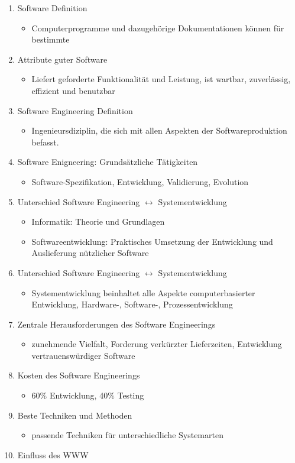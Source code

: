 \begin{enumerate}
    \item Software Definition
    \begin{itemize}
        \item Computerprogramme und dazugehörige Dokumentationen können für bestimmte 
    \end{itemize}
    \item Attribute guter Software 
    \begin{itemize}
        \item Liefert geforderte Funktionalität und Leistung, ist wartbar, zuverlässig, effizient und benutzbar
    \end{itemize}
    \item Software Engineering Definition 
    \begin{itemize}
        \item Ingenieursdiziplin, die sich mit allen Aspekten der Softwareproduktion befasst. 
    \end{itemize}
    \item Software Enigneering: Grundsätzliche Tätigkeiten
    \begin{itemize}
        \item Software-Spezifikation, Entwicklung, Validierung, Evolution
    \end{itemize}
    \item Unterschied Software Engineering $\leftrightarrow$ Systementwicklung
    \begin{itemize}
        \item Informatik: Theorie und Grundlagen
        \item Softwareentwicklung: Praktisches Umsetzung der Entwicklung und Auslieferung nützlicher Software 
    \end{itemize}
    \item Unterschied Software Engineering $\leftrightarrow$ Systementwicklung 
    \begin{itemize}
        \item Systementwicklung beinhaltet alle Aspekte computerbasierter Entwicklung, Hardware-, Software-, Prozessentwicklung
    \end{itemize}
    \item Zentrale Herausforderungen des Software Engineerings
    \begin{itemize}
        \item zunehmende Vielfalt, Forderung verkürzter Lieferzeiten, Entwicklung vertrauenswürdiger Software
    \end{itemize}
    \item Kosten des Software Engineerings 
    \begin{itemize}
        \item 60\% Entwicklung, 40\% Testing
    \end{itemize}
    \item Beste Techniken und Methoden
    \begin{itemize}
        \item passende Techniken für unterschiedliche Systemarten 
    \end{itemize}
    \item Einfluss des WWW 
\end{enumerate}
